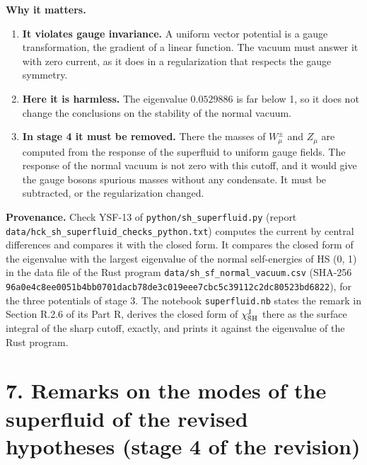 \documentclass[
  10pt,
]{article}
\providecommand{\tightlist}{%
  \setlength{\itemsep}{0pt}\setlength{\parskip}{0pt}}
\begin{document}
\textbf{Why it matters.}

\begin{enumerate}
\def\labelenumi{\arabic{enumi}.}
\tightlist
\item
  \textbf{It violates gauge invariance.} A uniform vector potential is a
  gauge transformation, the gradient of a linear function. The vacuum
  must answer it with zero current, as it does in a regularization that
  respects the gauge symmetry.
\item
  \textbf{Here it is harmless.} The eigenvalue \(0.0529886\) is far
  below 1, so it does not change the conclusions on the stability of the
  normal vacuum.
\item
  \textbf{In stage 4 it must be removed.} There the masses of
  \(W^\pm_\mu\) and \(Z_\mu\) are computed from the response of the
  superfluid to uniform gauge fields. The response of the normal vacuum
  is not zero with this cutoff, and it would give the gauge bosons
  spurious masses without any condensate. It must be subtracted, or the
  regularization changed.
\end{enumerate}

\textbf{Provenance.} Check YSF-13 of \texttt{python/sh\_superfluid.py}
(report \texttt{data/hck\_sh\_superfluid\_checks\_python.txt}) computes
the current by central differences and compares it with the closed form.
It compares the closed form of the eigenvalue with the largest
eigenvalue of the normal self-energies of HS (0, 1) in the data file of
the Rust program \texttt{data/sh\_sf\_normal\_vacuum.csv} (SHA-256
\texttt{96a0e4c8ee0051b4bb0701dacb78de3c019eee7cbc5c39112c2dc80523bd6822}),
for the three potentials of stage 3. The notebook \texttt{superfluid.nb}
states the remark in Section R.2.6 of its Part R, derives the closed
form of \(\chi^{\rm J}_{\rm SH}\) there as the surface integral of the
sharp cutoff, exactly, and prints it against the eigenvalue of the Rust
program.

\hypertarget{remarks-on-the-modes-of-the-superfluid-of-the-revised-hypotheses-stage-4-of-the-revision}{%
\section{7. Remarks on the modes of the superfluid of the revised
hypotheses (stage 4 of the
revision)}\label{remarks-on-the-modes-of-the-superfluid-of-the-revised-hypotheses-stage-4-of-the-revision}}
\end{document}
